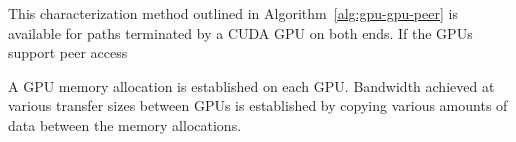 This characterization method outlined in Algorithm~\ref{alg:gpu-gpu-peer} is available for paths terminated by a CUDA GPU on both ends.
If the GPUs support peer access

A GPU memory allocation is established on each GPU.
Bandwidth achieved at various transfer sizes between GPUs is established by copying various amounts of data between the memory allocations.


